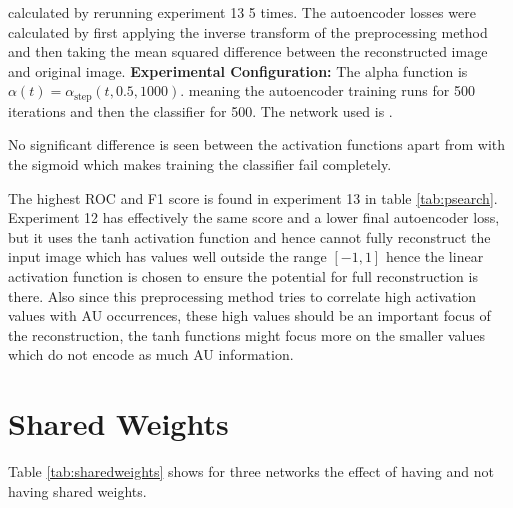 \begin{table}[!h]
{{              calculated by rerunning experiment 13 5 times. The autoencoder losses were calculated
              by first applying the inverse transform of the preprocessing method and then taking the mean squared
              difference between the reconstructed image and original image. {\bf Experimental Configuration:}
              The alpha function is $\alpha(t)=\alpha_{\text{step}}(t,0.5,1000)$.
              meaning the autoencoder training runs for 500 iterations and then the classifier for 500.
              The network used is \networkII.}
          \label{tab:psearch} }
          \end{table}

          No significant difference is seen between the activation functions apart from with the sigmoid
          which makes training the classifier fail completely.

          The highest ROC and F1 score is found in experiment 13 in table \ref{tab:psearch}. Experiment 12
          has effectively the same score and a lower final autoencoder loss, but it uses the tanh activation
          function and hence cannot fully reconstruct the input image which has values well outside the
          range $[-1,1]$ hence the linear activation function is chosen to ensure the potential for full reconstruction is there.
          Also since this preprocessing method tries to correlate high activation values with AU occurrences, these high values should be
          an important focus of the reconstruction, the tanh functions might focus more on the smaller values which
          do not encode as much AU information.

        \newpage
        \section{Shared Weights}

          Table \ref{tab:sharedweights} shows
          for three networks the effect of having and not having shared weights.

